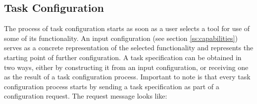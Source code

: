 \documentclass{article}
\begin{document}

  \subsection{Task Configuration} \label{ss:task_configuration}


   The process of task configuration starts as soon as a user selects a tool
   for use of some of its functionality.  An input configuration (see section
   \ref{ss:capabilities}) serves as a concrete representation of the selected
   functionality and represents the starting point of further configuration. A
   task specification can be obtained in two ways, either by constructing it
   from an input configuration, or receiving one as the result of a task
   configuration process. Important to note is that every task configuration
   process starts by sending a task specification as part of a configuration
   request. The request message looks like:

\end{document}
